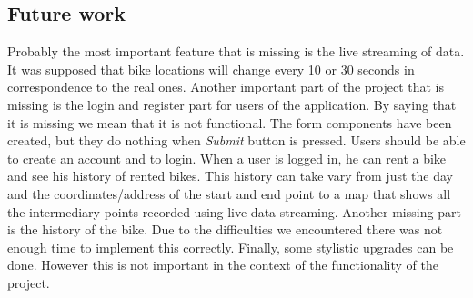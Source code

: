 \subsection{Future work}
Probably the most important feature that is missing is the live streaming of data. It was supposed that bike locations will change every 10 or 30 seconds in correspondence to the real ones. Another important part of the project that is missing is the login and register part for users of the application. By saying that it is missing we mean that it is not functional. The form components have been created, but they do nothing when \textit{Submit} button is pressed. Users should be able to create an account and to login. When a user is logged in, he can rent a bike and see his history of rented bikes. This history can take vary from just the day and the coordinates/address of the start and end point to a map that shows all the intermediary points recorded using live data streaming. Another missing part is the history of the bike. Due to the difficulties we encountered there was not enough time to implement this correctly. Finally, some stylistic upgrades can be done. However this is not important in the context of the functionality of the project.
